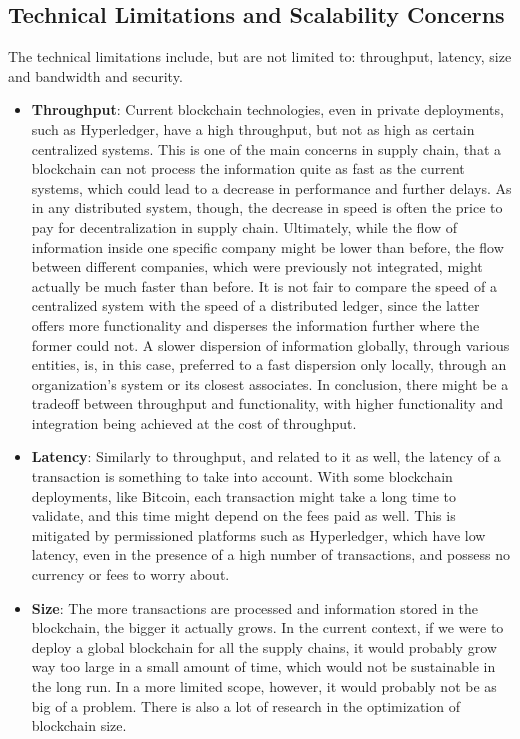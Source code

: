 \subsection{Technical Limitations and Scalability Concerns}
The technical limitations include, but are not limited to: throughput, latency, size and bandwidth and security.

\begin{itemize}
\item \textbf{Throughput}: Current blockchain technologies, even in private deployments, such as Hyperledger, have a high throughput, but not as high as certain centralized systems. This is one of the main concerns in supply chain, that a blockchain can not process the information quite as fast as the current systems, which could lead to a decrease in performance and further delays. As in any distributed system, though, the decrease in speed is often the price to pay for decentralization in supply chain. Ultimately, while the flow of information inside one specific company might be lower than before, the flow between different companies, which were previously not integrated, might actually be much faster than before. It is not fair to compare the speed of a centralized system with the speed of a distributed ledger, since the latter offers more functionality and disperses the information further where the former could not. A slower dispersion of information globally, through various entities, is, in this case, preferred to a fast dispersion only locally, through an organization's system or its closest associates.
In conclusion, there might be a tradeoff between throughput and functionality, with higher functionality and integration being achieved at the cost of throughput.
\item \textbf{Latency}: Similarly to throughput, and related to it as well, the latency of a transaction is something to take into account. With some blockchain deployments, like Bitcoin, each transaction might take a long time to validate, and this time might depend on the fees paid as well. This is mitigated by permissioned platforms such as Hyperledger, which have low latency, even in the presence of a high number of transactions, and possess no currency or fees to worry about.
\item \textbf{Size}: The more transactions are processed and information stored in the blockchain, the bigger it actually grows. In the current context, if we were to deploy a global blockchain for all the supply chains, it would probably grow way too large in a small amount of time, which would not be sustainable in the long run. In a more limited scope, however, it would probably not be as big of a problem. There is also a lot of research in the optimization of blockchain size.

\end{itemize}
